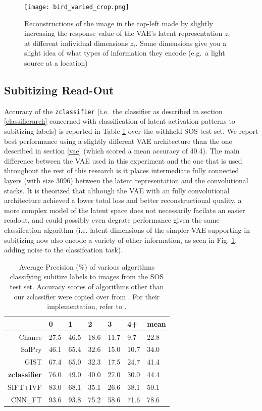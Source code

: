 \documentclass[twocolumn]{article}
\begin{document}

\begin{figure}
\centering
\texttt{[image: bird\_varied\_crop.png]}
\caption{Reconstructions of the image in the top-left made by slightly
increasing the response value of the VAE's latent representation \(z\),
at different individual dimensions \(z_i\). Some dimensions give
you a slight idea of what types of information they encode (e.g.~a light source at a
location)}
\label{fig:latent}
\end{figure}

\hypertarget{subitizing-read-out}{%
\subsection{Subitizing Read-Out}\label{subitizing-read-out}}

Accuracy of the \texttt{zclassifier} (i.e.~the classifier as described
in section \ref{classifierarch} concerned
with classification of latent activation patterns to subitizing labels)
is reported in Table \ref{tab:sub-performance} over the withheld SOS test set. We report best performance using a slightly different VAE architecture than the one described in
section \ref{vae} (which scored a mean accuracy of 40.4).
The main difference between the VAE used in this experiment and the one
that is used throughout the rest of this research is it places
intermediate fully connected layers (with size 3096) between the latent
representation and the convolutional stacks. It is theorized that although the VAE with an fully convolutional architecture achieved a lower total loss and better reconstructional quality, a more complex model of the latent space does not necessarily facilate an easier readout, and could possibly even degrate performance given the same classifcation algorithm (i.e. latent dimensions of the simpler VAE supporting in subitizing now also encode a variety of other information, as seen in Fig. \ref{fig:latent}, adding noise to the classifcation task). 

\begin{longtable}[]{@{}rllllll@{}}
\caption{Average Precision (\%) of various algorithms classifying subitize labels to images from the SOS test set. Accuracy scores of algorithms other than our zclassifier were copied over from \citet{zhang2016salient}. For their
implementation, refer to \citet{zhang2016salient}. }\label{tab:sub-performance}\\
\toprule
& 0 & 1 & 2 & 3 & 4+ & mean\tabularnewline
\midrule
\endhead
Chance & 27.5 & 46.5 & 18.6 & 11.7 & 9.7 & 22.8\tabularnewline
SalPry & 46.1 & 65.4 & 32.6 & 15.0 & 10.7 & 34.0\tabularnewline
GIST & 67.4 & 65.0 & 32.3 & 17.5 & 24.7 & 41.4\tabularnewline
\textbf{zclassifier} & 76.0 & 49.0 & 40.0 & 27.0 & 30.0 & 44.4\tabularnewline
SIFT+IVF & 83.0 & 68.1 & 35.1 & 26.6 & 38.1 & 50.1\tabularnewline
CNN\_FT & 93.6 & 93.8 & 75.2 & 58.6 & 71.6 & 78.6\tabularnewline
\bottomrule
\end{longtable}
\end{document}
